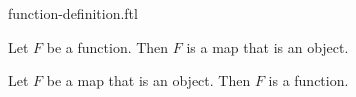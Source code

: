 \documentclass{stex}
\begin{document}
\begin{smodule}{function-definition.ftl}
  \begin{flemma*}
    Let $F$ be a function.
    Then $F$ is a map that is an object.
  \end{flemma*}

  \begin{flemma*}
    Let $F$ be a map that is an object.
    Then $F$ is a function.
  \end{flemma*}
\end{smodule}
\end{document}
